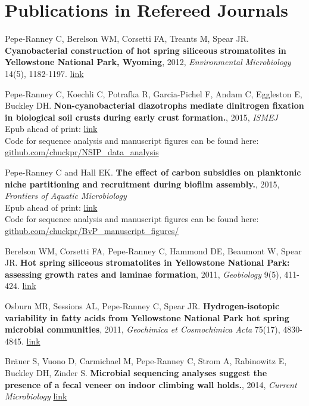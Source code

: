 \documentclass[letterpaper]{article}
\renewenvironment{itemize}{
  \begin{list}{}{
    \setlength{\leftmargin}{1.5em}
  }
}{
  \end{list}
}
\begin{document}
\section*{Publications in Refereed Journals}
\begin{itemize}
\item Pepe-Ranney C, Berelson WM, Corsetti FA, Treants M, Spear JR.
    \textbf{Cyanobacterial construction of hot spring siliceous stromatolites in
    Yellowstone National Park, Wyoming}, 2012, \textit{Environmental
    Microbiology} 14(5), 1182-1197. \href{http://www.ncbi.nlm.nih.gov/pubmed/22356555}{link} 
\item Pepe-Ranney C, Koechli C, Potrafka R, Garcia-Pichel F, Andam C, Eggleston E, Buckley DH. 
    \textbf{Non-cyanobacterial diazotrophs mediate dinitrogen fixation in
    biological soil crusts during early crust formation.}, 2015, \textit{ISMEJ}\\ 
    Epub ahead of print: \href{http://dx.doi.org/10.1101/013813}
    {link}\\
    Code for sequence analysis and manuscript figures can be found here:\\
    \href{http://www.github.com/chuckpr/NSIP_data_analysis}
    {github.com/chuckpr/NSIP\_data\_analysis}
\item Pepe-Ranney C and Hall EK. \textbf{The effect of carbon subsidies on
    planktonic niche partitioning and recruitment during biofilm
    assembly.}, 2015, \textit{Frontiers of Aquatic Microbiology}\\
    Epub ahead of print: \href{http://journal.frontiersin.org/article/10.3389/fmicb.2015.00703/abstract}
    {link}\\
    Code for sequence analysis and manuscript figures can be found here: \\
    \href{http://www.github.com/chuckpr/BvP_manuscript_figures/}
    {github.com/chuckpr/BvP\_manuscript\_figures/}
\item Berelson WM, Corsetti FA, Pepe-Ranney C, Hammond DE, Beaumont W, Spear
    JR. \textbf{Hot spring siliceous stromatolites in Yellowstone National Park:
    assessing growth rates and laminae formation}, 2011, {\it Geobiology}
    9(5), 411-424. \href{http://www.ncbi.nlm.nih.gov/pubmed/21777367}{link}
\item Osburn MR, Sessions AL, Pepe-Ranney C, Spear JR. \textbf{Hydrogen-isotopic
    variability in fatty acids from Yellowstone National Park hot spring
    microbial communities}, 2011, {\it Geochimica et Cosmochimica Acta}
    75(17), 4830-4845.
    \href{http://www.sciencedirect.com/science/article/pii/S0016703711003152}{link}
\item Br\"{a}uer S, Vuono D, Carmichael M, Pepe-Ranney C, Strom A, Rabinowitz
    E, Buckley DH, Zinder S. \textbf{Microbial sequencing analyses suggest
    the presence of a fecal veneer on indoor climbing wall holds.}, 2014, {\it
    Current Microbiology} \href{http://www.ncbi.nlm.nih.gov/pubmed/24972665}{link}
\end{itemize}
\end{document}
